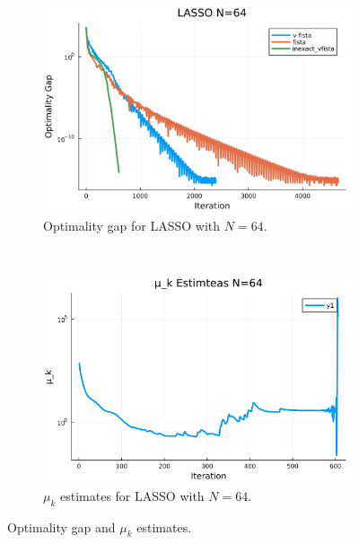 \documentclass[12pt]{article}
\begin{document}
        \begin{figure}[H]
            \centering
            \begin{subfigure}[b]{0.47\textwidth}
                \centering
                \includegraphics[width=\textwidth]{assets/lasso_loss_64.png}
                \caption{Optimality gap for LASSO with $N = 64$.}
            \end{subfigure}
            ~
            \begin{subfigure}[b]{0.47\textwidth}
                \centering
                \includegraphics[width=\textwidth]{assets/lasso_sc_estimates_64.png}
                \caption{$\mu_k$ estimates for LASSO with $N = 64$.}
            \end{subfigure}
            \caption{Optimality gap and $\mu_k$ estimates. }
            \label{fig:lasso-experiment-64}
        \end{figure}
\end{document}

